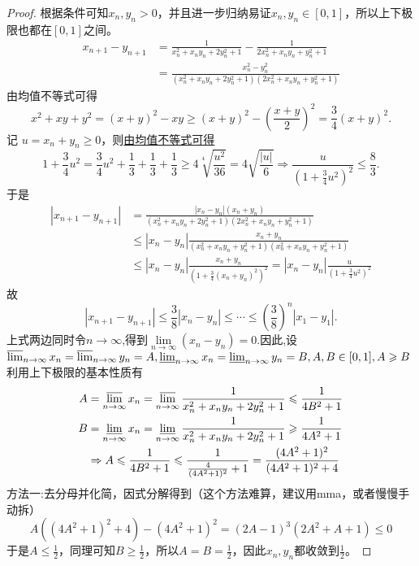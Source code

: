 \documentclass[../../main.tex]{subfiles}
\begin{document}
\begin{proof}
根据条件可知\(x_n,y_n > 0\)，并且进一步归纳易证\(x_n,y_n\in[0,1]\)，所以上下极限也都在\([0,1]\)之间。
\begin{align*}
x_{n + 1}-y_{n + 1}&=\frac{1}{x_n^2 + x_ny_n + 2y_n^2 + 1}-\frac{1}{2x_n^2 + x_ny_n + y_n^2 + 1}\\
&=\frac{x_n^2 - y_n^2}{(x_n^2 + x_ny_n + 2y_n^2 + 1)(2x_n^2 + x_ny_n + y_n^2 + 1)}
\end{align*}
由均值不等式可得
\[
x^2 + xy + y^2=(x + y)^2 - xy\geqslant (x + y)^2 - \left(\frac{x + y}{2}\right)^2=\frac{3}{4}(x + y)^2.
\]
记 \(u = x_n + y_n\geqslant  0\)，则\hyperlink{均值放缩的思路}{由均值不等式可得}
\[
1+\frac{3}{4}u^2=\frac{3}{4}u^2+\frac{1}{3}+\frac{1}{3}+\frac{1}{3}\geqslant  4\sqrt[4]{\frac{u^2}{36}}=4\sqrt{\frac{|u|}{6}}\Rightarrow \frac{u}{(1+\frac{3}{4}u^2)^2}\le \frac{8}{3}.
\]
于是
\begin{align*}
|x_{n + 1}-y_{n + 1}|&=\frac{|x_n - y_n|(x_n + y_n)}{(x_{n}^{2}+x_ny_n + 2y_{n}^{2}+1)(2x_{n}^{2}+x_ny_n + y_{n}^{2}+1)}\\
&\le |x_n - y_n|\frac{x_n + y_n}{(x_{n}^{2}+x_ny_n + y_{n}^{2}+1)(x_{n}^{2}+x_ny_n + y_{n}^{2}+1)}\\
&\le |x_n - y_n|\frac{x_n + y_n}{(1+\frac{3}{4}(x_n + y_n)^2)^2}=|x_n - y_n|\frac{u}{(1+\frac{3}{4}u^2)^2}
\end{align*}
故
\[
|x_{n + 1}-y_{n + 1}|\le \frac{3}{8}|x_n - y_n|\le \cdots \le (\frac{3}{8})^n|x_1 - y_1|.
\]
上式两边同时令$n\to \infty$,得到$\underset{n\rightarrow \infty}{\lim}\left( x_n-y_n \right) =0$.因此,设
\(\varlimsup_{n\rightarrow\infty}x_n=\varlimsup_{n\rightarrow\infty}y_n = A,\varliminf_{n\rightarrow\infty}x_n=\varliminf_{n\rightarrow\infty}y_n = B,A,B\in[0,1],A\geqslant  B\)
利用上下极限的基本性质有
\begin{align*}
A&=\varlimsup_{n\rightarrow\infty}x_n=\varlimsup_{n\rightarrow\infty}\frac{1}{x_n^2 + x_ny_n + 2y_n^2 + 1}\leqslant \frac{1}{4B^2 + 1}\\
B&=\varliminf_{n\rightarrow\infty}x_n=\varliminf_{n\rightarrow\infty}\frac{1}{x_n^2 + x_ny_n + 2y_n^2 + 1}\geqslant \frac{1}{4A^2 + 1}\\
&\Rightarrow A\leqslant \frac{1}{4B^2 + 1}\leqslant \frac{1}{\frac{4}{(4A^2 + 1)^2}+1}=\frac{(4A^2 + 1)^2}{(4A^2 + 1)^2 + 4}
\end{align*}
{\color{blue}方法一:}去分母并化简，因式分解得到（这个方法难算，建议用mma，或者慢慢手动拆）
\[A((4A^2 + 1)^2 + 4)-(4A^2 + 1)^2=(2A - 1)^3(2A^2 + A + 1)\leqslant 0\]
于是\(A\leqslant \frac{1}{2}\)，同理可知\(B\geqslant \frac{1}{2}\)，所以\(A = B=\frac{1}{2}\)，因此\(x_n,y_n\)都收敛到\(\frac{1}{2}\)。


\end{proof}
\end{document}
